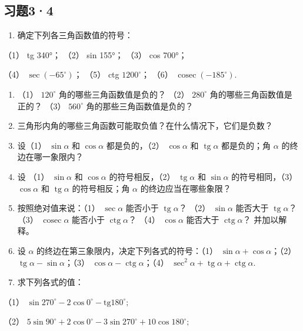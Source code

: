 \subsection{习题3·4}

\begin{enumerate}
\item
  确定下列各三角函数值的符号：
\end{enumerate}

（1） tg 340°； （2） sin 155°； （3） cos 700°；

（4） \(\sec (-65^{\circ})\)； （5） ctg \(1200^{\circ}\)； （6）
\(\operatorname{cosec} (-185^{\circ})\).

\begin{enumerate}[start=2]
\item
  （1） \(120^{\circ}\) 角的哪些三角函数值是负的？ （2） \(280^{\circ}\)
  角的哪些三角函数值是正的？ （3） \(560^{\circ}\)
  角的那些三角函数值是负的？
\item
  三角形内角的哪些三角函数可能取负值？在什么情况下，它们是负数？
\item
  设（1） \(\sin \alpha\) 和 \(\cos \alpha\) 都是负的，（2）
  \(\cos \alpha\) 和 \(\operatorname{tg} \alpha\) 都是负的；角
  \(\alpha\) 的终边在哪一象限内？
\item
  设 （1） \(\sin \alpha\) 和 \(\cos \alpha\) 的符号相反，（2）
  \(\operatorname{tg} \alpha\) 和 \(\sin \alpha\) 的符号相同，（3）
  \(\cos \alpha\) 和 \(\operatorname{tg} \alpha\) 的符号相反；角
  \(\alpha\) 的终边应当在哪些象限？
\item
  按照绝对值来说：（1） \(\sec \alpha\) 能否小于
  \(\operatorname{tg} \alpha\)？ （2） \(\sin \alpha\) 能否大于
  \(\operatorname{tg} \alpha\)？ （3） \(\operatorname{cosec} \alpha\)
  能否小于 \(\operatorname{ctg} \alpha\)？ （4） \(\cos \alpha\)
  能否大于 \(\operatorname{ctg} \alpha\)？ 并加以解释。
\item
  设 \(\alpha\) 的终边在第三象限内，决定下列各式的符号：（1）
  \(\sin \alpha + \cos \alpha\)；（2）
  \(\operatorname{tg} \alpha - \sin \alpha\)；（3）
  \(\cos \alpha - \operatorname{ctg} \alpha\)；（4）
  \(\sec^2 \alpha + \operatorname{tg} \alpha + \operatorname{ctg} \alpha\).
\item
  求下列各式的值：
\end{enumerate}

（1） \(\sin 270^{\circ} - 2\cos 0^{\circ} - \mathrm{tg}180^{\circ};\)

（2）
\(5\sin 90^{\circ} + 2\cos 0^{\circ} - 3\sin 270^{\circ} + 10\cos 180^{\circ};\)


